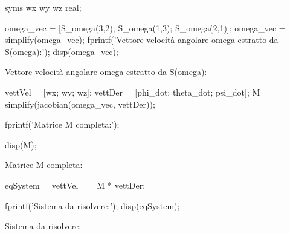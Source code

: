 \documentclass[11pt, a4paper]{article}
\begin{document}
\begin{matlabcode}
syms wx wy wz real;

omega_vec = [S_omega(3,2); S_omega(1,3); S_omega(2,1)];
omega_vec = simplify(omega_vec);
fprintf('Vettore velocità angolare omega estratto da S(omega):');
disp(omega_vec);
\end{matlabcode}
\begin{matlaboutput}
Vettore velocità angolare omega estratto da S(omega):
\end{matlaboutput}
\begin{matlabcode}

vettVel = [wx; wy; wz];
vettDer = [phi_dot; theta_dot; psi_dot];
M = simplify(jacobian(omega_vec, vettDer));

fprintf('Matrice M completa:\n');

disp(M);
\end{matlabcode}
\begin{matlaboutput}
Matrice M completa:
\end{matlaboutput}
\begin{matlabcode}
eqSystem = vettVel == M * vettDer;

fprintf('Sistema da risolvere:');
disp(eqSystem);
\end{matlabcode}
\begin{matlaboutput}
Sistema da risolvere:
\end{matlaboutput}
\end{document}
